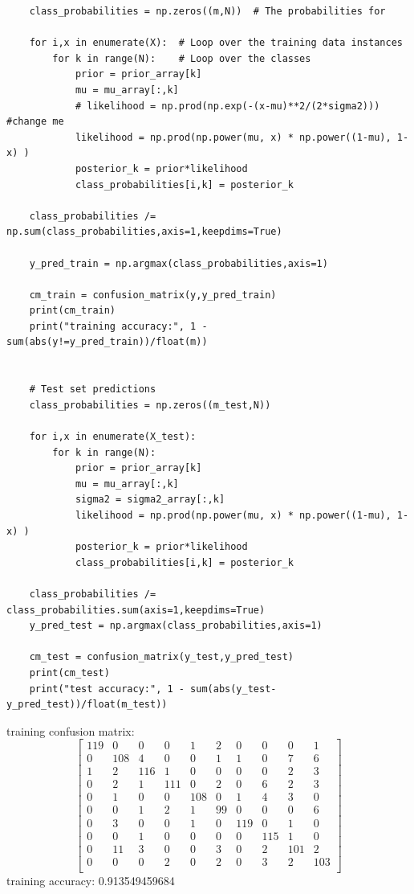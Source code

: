 \documentclass[12pt]{article}
\begin{document}
\begin{flushleft}
\begin{lstlisting}
	class_probabilities = np.zeros((m,N))  # The probabilities for 
	
	for i,x in enumerate(X):  # Loop over the training data instances
		for k in range(N):    # Loop over the classes
			prior = prior_array[k]
			mu = mu_array[:,k]
			# likelihood = np.prod(np.exp(-(x-mu)**2/(2*sigma2))) #change me
			likelihood = np.prod(np.power(mu, x) * np.power((1-mu), 1-x) )
			posterior_k = prior*likelihood
			class_probabilities[i,k] = posterior_k
	
	class_probabilities /= np.sum(class_probabilities,axis=1,keepdims=True)
	
	y_pred_train = np.argmax(class_probabilities,axis=1)
	
	cm_train = confusion_matrix(y,y_pred_train)
	print(cm_train)
	print("training accuracy:", 1 - sum(abs(y!=y_pred_train))/float(m))
	
	
	# Test set predictions
	class_probabilities = np.zeros((m_test,N))
	
	for i,x in enumerate(X_test):
		for k in range(N):
			prior = prior_array[k]
			mu = mu_array[:,k]
			sigma2 = sigma2_array[:,k]
			likelihood = np.prod(np.power(mu, x) * np.power((1-mu), 1-x) )
			posterior_k = prior*likelihood
			class_probabilities[i,k] = posterior_k
	
	class_probabilities /= class_probabilities.sum(axis=1,keepdims=True)
	y_pred_test = np.argmax(class_probabilities,axis=1)
	
	cm_test = confusion_matrix(y_test,y_pred_test)
	print(cm_test)
	print("test accuracy:", 1 - sum(abs(y_test-y_pred_test))/float(m_test))

\end{lstlisting}
\vspace{0.5cm}
training confusion matrix:
\[
\begin{bmatrix}
119  &0    &0    &0    &1    &2    &0    &0    &0    &1\\
0    &108  &4    &0    &0    &1    &1    &0    &7    &6\\
1    &2    &116  &1    &0    &0    &0    &0    &2    &3\\
0    &2    &1    &111  &0    &2    &0    &6    &2    &3\\
0    &1    &0    &0    &108  &0    &1    &4    &3    &0\\
0    &0    &1    &2    &1    &99   &0    &0    &0    &6\\
0    &3    &0    &0    &1    &0    &119  &0    &1    &0\\
0    &0    &1    &0    &0    &0    &0    &115  &1    &0\\
0    &11   &3    &0    &0    &3    &0    &2    &101  &2\\
0    &0    &0    &2    &0    &2    &0    &3    &2    &103\\
\end{bmatrix}
\]
training accuracy: 0.913549459684\\



\end{flushleft}
\end{document}
